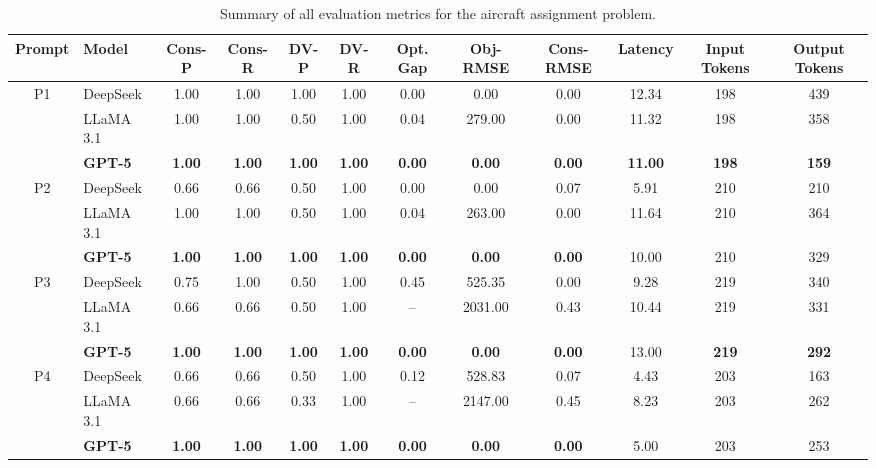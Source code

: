 \documentclass[review,12pt]{elsarticle}
\begin{document}
\begin{table}[htbp]
\centering
\caption{Summary of all evaluation metrics for the aircraft assignment problem.}
\label{table:aircraft_assignment_summary}
\renewcommand{\arraystretch}{0.9} %
\setlength{\tabcolsep}{2pt}      %
\scriptsize                       %

\begin{adjustbox}{max width=\textwidth}
\begin{tabular}{c l c c c c c c c c c c}
\toprule
\textbf{Prompt} & \textbf{Model} & \textbf{Cons-P} & \textbf{Cons-R} & \textbf{DV-P} & \textbf{DV-R} & \textbf{Opt. Gap} & \textbf{Obj-RMSE} & \textbf{Cons-RMSE} & \textbf{Latency} & \textbf{Input Tokens} & \textbf{Output Tokens} \\
\midrule
P1 & DeepSeek & 1.00 & 1.00 & 1.00 & 1.00 & 0.00 & 0.00 & 0.00 & 12.34 & 198 & 439 \\[-4pt]
   & LLaMA 3.1 & 1.00 & 1.00 & 0.50 & 1.00 & 0.04 & 279.00 & 0.00 & 11.32 & 198 & 358 \\[-4pt]
   & \textbf{GPT-5} & \textbf{1.00} & \textbf{1.00} & \textbf{1.00} & \textbf{1.00} & \textbf{0.00} & \textbf{0.00} & \textbf{0.00} & \textbf{11.00} & \textbf{198} & \textbf{159} \\
\midrule
P2 & DeepSeek & 0.66 & 0.66 & 0.50 & 1.00 & 0.00 & 0.00 & 0.07 & 5.91 & 210 & 210 \\[-4pt]
   & LLaMA 3.1 & 1.00 & 1.00 & 0.50 & 1.00 & 0.04 & 263.00 & 0.00 & 11.64 & 210 & 364 \\[-4pt]
   & \textbf{GPT-5} & \textbf{1.00} & \textbf{1.00} & \textbf{1.00} & \textbf{1.00} & \textbf{0.00} & \textbf{0.00} & \textbf{0.00} & 10.00 & 210 & 329 \\
\midrule
P3 & DeepSeek & 0.75 & 1.00 & 0.50 & 1.00 & 0.45 & 525.35 & 0.00 & 9.28 & 219 & 340 \\[-4pt]
   & LLaMA 3.1 & 0.66 & 0.66 & 0.50 & 1.00 & -- & 2031.00 & 0.43 & 10.44 & 219 & 331 \\[-4pt]
   & \textbf{GPT-5} & \textbf{1.00} & \textbf{1.00} & \textbf{1.00} & \textbf{1.00} & \textbf{0.00} & \textbf{0.00} & \textbf{0.00} & 13.00 & \textbf{219} & \textbf{292} \\
\midrule
P4 & DeepSeek & 0.66 & 0.66 & 0.50 & 1.00 & 0.12 & 528.83 & 0.07 & 4.43 & 203 & 163 \\[-4pt]
   & LLaMA 3.1 & 0.66 & 0.66 & 0.33 & 1.00 & -- & 2147.00 & 0.45 & 8.23 & 203 & 262 \\[-4pt]
   & \textbf{GPT-5} & \textbf{1.00} & \textbf{1.00} & \textbf{1.00} & \textbf{1.00} & \textbf{0.00} & \textbf{0.00} & \textbf{0.00} & 5.00 & 203 & 253 \\

\end{tabular}
\end{adjustbox}
\end{table}
\end{document}
